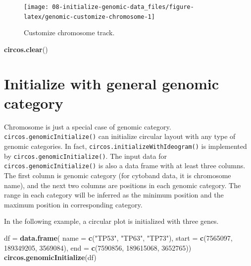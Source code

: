 \documentclass[]{book}
\newenvironment{Shaded}{\begin{snugshade}}{\end{snugshade}}
\newcommand{\KeywordTok}[1]{\textcolor[rgb]{0.13,0.29,0.53}{\textbf{#1}}}
\newcommand{\DataTypeTok}[1]{\textcolor[rgb]{0.13,0.29,0.53}{#1}}
\newcommand{\DecValTok}[1]{\textcolor[rgb]{0.00,0.00,0.81}{#1}}
\newcommand{\StringTok}[1]{\textcolor[rgb]{0.31,0.60,0.02}{#1}}
\newcommand{\NormalTok}[1]{#1}
\begin{document}
\begin{figure}

{\centering \texttt{[image: 08-initialize-genomic-data\_files/figure-latex/genomic-customize-chromosome-1]} 

}

\caption{Customize chromosome track.}\label{fig:genomic-customize-chromosome}
\end{figure}

\begin{Shaded}
\begin{Highlighting}[]
\KeywordTok{circos.clear}\NormalTok{()}
\end{Highlighting}
\end{Shaded}

\section{Initialize with general genomic
category}\label{initialize-with-general-genomic-category}

Chromosome is just a special case of genomic category.
\texttt{circos.genomicInitialize()} can initialize circular layout with
any type of genomic categories. In fact,
\texttt{circos.initializeWithIdeogram()} is implemented by
\texttt{circos.genomicInitialize()}. The input data for
\texttt{circos.genomicInitialize()} is also a data frame with at least
three columns. The first column is genomic category (for cytoband data,
it is chromosome name), and the next two columns are positions in each
genomic category. The range in each category will be inferred as the
minimum position and the maximum position in corresponding category.

In the following example, a circular plot is initialized with three
genes.

\begin{Shaded}
\begin{Highlighting}[]
\NormalTok{df =}\StringTok{ }\KeywordTok{data.frame}\NormalTok{(}
    \DataTypeTok{name  =} \KeywordTok{c}\NormalTok{(}\StringTok{"TP53"}\NormalTok{,  }\StringTok{"TP63"}\NormalTok{,    }\StringTok{"TP73"}\NormalTok{),}
    \DataTypeTok{start =} \KeywordTok{c}\NormalTok{(}\DecValTok{7565097}\NormalTok{, }\DecValTok{189349205}\NormalTok{, }\DecValTok{3569084}\NormalTok{),}
    \DataTypeTok{end   =} \KeywordTok{c}\NormalTok{(}\DecValTok{7590856}\NormalTok{, }\DecValTok{189615068}\NormalTok{, }\DecValTok{3652765}\NormalTok{))}
\KeywordTok{circos.genomicInitialize}\NormalTok{(df)}
\end{Highlighting}
\end{Shaded}
\end{document}
